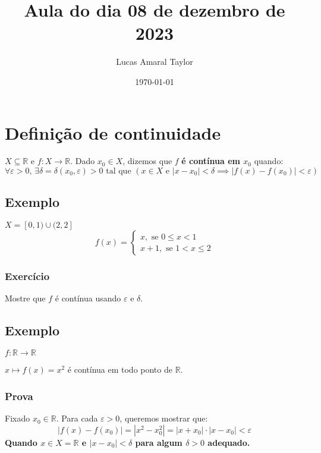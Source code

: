 \documentclass[12pt]{article}
\title{Aula do dia 08 de dezembro de 2023}
\author{Lucas Amaral Taylor}
\date{\today}
\begin{document}
    \maketitle
    \section*{Definição de continuidade}
    $X \subseteq \mathbb{R}$ e $f: X \to \mathbb{R}$. Dado $x_0 \in X$, dizemos que $f$ \textbf{é contínua em $x_0$} quando:
    \begin{equation*}
        \forall \varepsilon > 0 \text{, } \exists \delta = \delta(x_0, \varepsilon) > 0 \text{ tal que } \left( x \in X \text{ e } \left| x - x_0 \right| < \delta \implies \left| f(x) - f(x_0)\right| < \varepsilon \right)
    \end{equation*}
    
    \subsection*{Exemplo}
    $X = [0,1) \cup (2,2]$
    \begin{equation*}
        f(x)=\left\{    
        \begin{array}{l}
            x, \text{ se } 0 \leq x < 1 \\
            x+1, \text{ se } 1 <x \leq 2
        \end{array}
        \right.
    \end{equation*}
    \subsubsection*{Exercício}
    Mostre que $f$ é contínua usando $\varepsilon$ e $\delta$.
    
    \subsection*{Exemplo}
    $f: \mathbb{R} \to \mathbb{R}$
    
    $x \longmapsto f(x) = x^2$ é contínua em todo ponto de $\mathbb{R}$. 
    
    \subsubsection*{Prova}
    Fixado $x_0 \in \mathbb{R}$. Para cada $\varepsilon > 0$, queremos mostrar que: 
    \begin{equation*}
        |f(x) - f(x_0)| = |x^2 - x_0^2| = |x + x_0| \cdot |x - x_0| < \varepsilon
    \end{equation*}
    \textbf{Quando $x \in X = \mathbb{R}$ e $|x-x_0| < \delta$  para algum $\delta > 0$ adequado.}
    
\end{document}
